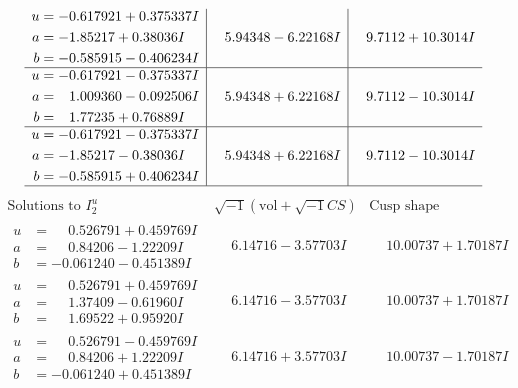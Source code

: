 \documentclass[1p]{elsarticle_modified}
\theoremstyle{definition}
\newcommand{\I}{\sqrt{-1}}
\begin{document}
$$\begin{array}{c|c|c}
\begin{aligned}
u &= -0.617921 + 0.375337 I \\
a &= -1.85217 + 0.38036 I \\
b &= -0.585915 - 0.406234 I\end{aligned}
 & \phantom{-}5.94348 - 6.22168 I & \phantom{-}9.7112 + 10.3014 I \\ \hline\begin{aligned}
u &= -0.617921 - 0.375337 I \\
a &= \phantom{-}1.009360 - 0.092506 I \\
b &= \phantom{-}1.77235 + 0.76889 I\end{aligned}
 & \phantom{-}5.94348 + 6.22168 I & \phantom{-}9.7112 - 10.3014 I \\ \hline\begin{aligned}
u &= -0.617921 - 0.375337 I \\
a &= -1.85217 - 0.38036 I \\
b &= -0.585915 + 0.406234 I\end{aligned}
 & \phantom{-}5.94348 + 6.22168 I & \phantom{-}9.7112 - 10.3014 I\\
 \hline 
 \end{array}$$\newpage$$\begin{array}{c|c|c}  
\text{Solutions to }I^u_{2}& \I (\text{vol} + \sqrt{-1}CS) & \text{Cusp shape}\\
 \hline 
\begin{aligned}
u &= \phantom{-}0.526791 + 0.459769 I \\
a &= \phantom{-}0.84206 - 1.22209 I \\
b &= -0.061240 - 0.451389 I\end{aligned}
 & \phantom{-}6.14716 - 3.57703 I & \phantom{-}10.00737 + 1.70187 I \\ \hline\begin{aligned}
u &= \phantom{-}0.526791 + 0.459769 I \\
a &= \phantom{-}1.37409 - 0.61960 I \\
b &= \phantom{-}1.69522 + 0.95920 I\end{aligned}
 & \phantom{-}6.14716 - 3.57703 I & \phantom{-}10.00737 + 1.70187 I \\ \hline\begin{aligned}
u &= \phantom{-}0.526791 - 0.459769 I \\
a &= \phantom{-}0.84206 + 1.22209 I \\
b &= -0.061240 + 0.451389 I\end{aligned}
 & \phantom{-}6.14716 + 3.57703 I & \phantom{-}10.00737 - 1.70187 I \\ \hline\begin{aligned}

\end{aligned}
\end{array}$$
\end{document}
